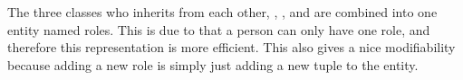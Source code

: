 The three classes who inherits from each other, \client[], \staff[], and \admin[] are combined into one entity named roles. This is due to that a person can only have one role, and therefore this representation is more efficient. This also gives a nice modifiability because adding a new role is simply just adding a new tuple to the entity. 
